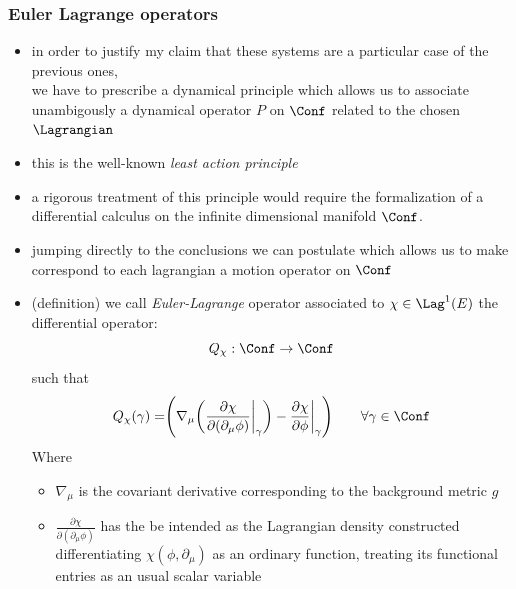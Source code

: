 \documentclass[a4paper,11pt]{scrartcl}
\begin{document}
	\subsubsection*{Euler Lagrange operators}
	\begin{itemize}
		\item in order to justify my claim that these systems are a particular case of the previous ones,\\
		 we have to prescribe a dynamical principle which allows us to associate unambigously a dynamical operator $P$ on $\Conf$ related to the chosen $\Lagrangian$
		 \item this is the well-known \emph{least action principle}
		 \item a rigorous treatment of this principle would require the formalization of a differential calculus on the infinite dimensional  manifold $\Conf$.
		 \item jumping directly to the conclusions we can postulate which allows us to make correspond to each lagrangian a motion operator on $\Conf$
		 \item (definition) we call \emph{Euler-Lagrange} operator associated to $\chi \in \Lag^1(E)$ the differential operator:
		 $$ Q_\chi : \Conf \rightarrow \Conf $$
		 such that
		 $$ 	Q_\chi (\gamma) = \Biggr( \nabla_\mu \biggr( \frac{\partial \chi}{\partial(\partial_\mu \phi)} \biggr\vert_\gamma \biggr) - \frac{\partial \chi}{\partial \phi}\biggr\vert_\gamma \Biggr) \qquad \forall \gamma \in \Conf $$
		Where 
		\begin{itemize}
			\item $\nabla_\mu$ is the covariant derivative corresponding to the background metric $g$
			\item $\frac{\partial \chi}{\partial(\partial_\mu \phi)}$ has the be intended as the Lagrangian density constructed differentiating $\chi(\phi, \partial_\mu)$ as an ordinary function, treating its functional entries as an usual scalar variable
		\end{itemize}
	\end{itemize}
\end{document}

